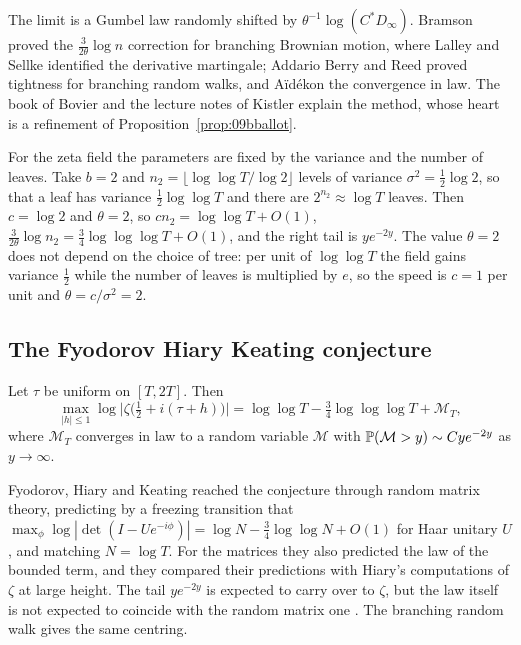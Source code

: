The limit is a Gumbel law randomly shifted by $\theta^{-1}\log(C^*D_\infty)$. Bramson \cite{bramson1978} proved the $\frac{3}{2\theta}\log n$ correction for branching Brownian motion, where Lalley and Sellke \cite{lalleysellke1987} identified the derivative martingale; Addario Berry and Reed \cite{addarioberryreed2009} proved tightness for branching random walks, and A\"id\'ekon \cite{aidekon2013} the convergence in law. The book of Bovier \cite{bovier2017} and the lecture notes of Kistler \cite{kistler2015} explain the method, whose heart is a refinement of Proposition~\ref{prop:09bballot}.

For the zeta field the parameters are fixed by the variance and the number of leaves. Take $b=2$ and $n_2=\lfloor\log\log T/\log2\rfloor$ levels of variance $\sigma^2=\frac12\log2$, so that a leaf has variance $\frac12\log\log T$ and there are $2^{n_2}\approx\log T$ leaves. Then $c=\log2$ and $\theta=2$, so $cn_2=\log\log T+O(1)$, $\frac3{2\theta}\log n_2=\frac34\log\log\log T+O(1)$, and the right tail is $ye^{-2y}$. The value $\theta=2$ does not depend on the choice of tree: per unit of $\log\log T$ the field gains variance $\frac12$ while the number of leaves is multiplied by $e$, so the speed is $c=1$ per unit and $\theta=c/\sigma^2=2$.

\subsection{The Fyodorov Hiary Keating conjecture}

\begin{conjecture}\label{conj:09bfhk}
Let $\tau$ be uniform on $[T,2T]$. Then
\[
\max_{|h|\le1}\log\bigl|\zeta\bigl(\tfrac12+i(\tau+h)\bigr)\bigr|=\log\log T-\tfrac34\log\log\log T+\mathcal{M}_T,
\]
where $\mathcal{M}_T$ converges in law to a random variable $\mathcal{M}$ with $\mathbb{P}(\mathcal{M}>y)\sim Cye^{-2y}$ as $y\to\infty$.
\end{conjecture}

Fyodorov, Hiary and Keating reached the conjecture through random matrix theory, predicting by a freezing transition that $\max_\phi\log|\det(I-Ue^{-i\phi})|=\log N-\frac34\log\log N+O(1)$ for Haar unitary $U$, and matching $N=\log T$. For the matrices they also predicted the law of the bounded term, and they compared their predictions with Hiary's computations of $\zeta$ at large height. The tail $ye^{-2y}$ is expected to carry over to $\zeta$, but the law itself is not expected to coincide with the random matrix one \cite{fyodorovkeating2014,abr2023}. The branching random walk gives the same centring.

